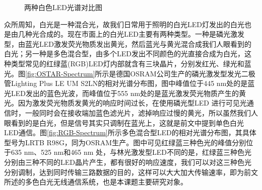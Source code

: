 \begin{figure}[htbp]
    \centering
    \caption{两种白色LED光谱对比图}
    \label{fig:WhiteLED}
\end{figure}

众所周知，白光是一种混合光，故我们日常用于照明的白光LED灯发出的白光也是由几种光合成的。现在市面上的白光LED主要有两种类型。一种是磷光激发型，由蓝光LED激发荧光物质发出黄光，然后蓝光与黄光混合成我们人眼看到的白光；另一种是多色混合型，由多个LED发出不同颜色的光直接合成为白光，这种类型常见的红绿蓝(RGB)LED灯内部就含有三块晶片，分别发红光、绿光和蓝光。图\ref{fig:OSTAR-Spectrum}所示是德国OSRAM公司生产的磷光激发型发光二极管Lighting Plus LE UM S2LN的相对光谱分布图\cite{LE2011}，图中峰值位于445 nm处的是蓝光LED发出的蓝色光波，而峰值位于555 nm处的是蓝光激发荧光物质产生的黄光。因为激发荧光物质发黄光的响应时间过长，在使用磷光型LED 进行可见光通信时，一般同时会在接收端加蓝色滤光片，滤掉响应过慢的黄光，所以虽然我们人眼看到的是白光，但是信号其实只调制在蓝光上，这就是前文中提到单色白光LED通信。图\ref{fig:RGB-Spectrum}所示多色混合型LED的相对光谱分布图\citep{LRTB2011}，其具体型号为LRTB R98G，同为OSRAM生产。图中可见红绿蓝三种色光的峰值分别位于635 nm、525 nm和465 nm 处，与林光激发型LED不同的是，红绿蓝三种色光分别由三种不同的LED晶片产生，都有很好的响应速度，我们可以对这三种色光分别调制，达到同时传输三路数据的目的，这样可以大大加大传输速率，即为前文所述的多色白光无线通信系统，也是本课题主要研究对象。


